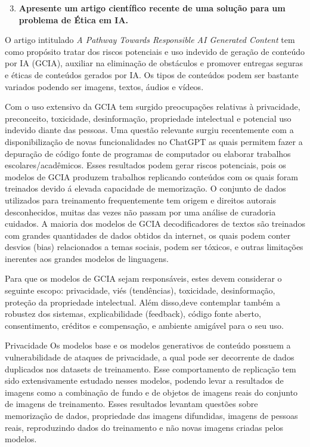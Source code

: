\begin{enumerate}\setcounter{enumi}{2}\bfseries
    \item  \textbf{Apresente um artigo científico recente de uma solução para um problema de Ética em IA.}
\end{enumerate}

O artigo intitulado \textit{A Pathway Towards Responsible AI Generated Content} \cite{chen_fu_lyu} tem como propósito tratar dos riscos potenciais e uso indevido de geração de conteúdo 
por IA (GCIA), 
auxiliar na eliminação de obstáculos e promover entregas seguras e éticas de conteúdos gerados por IA. 
Os tipos de conteúdos podem ser bastante variados podendo ser imagens, textos, áudios e vídeos. 


Com o uso extensivo da GCIA tem surgido preocupações relativas à privacidade, preconceito, toxicidade, desinformação, 
propriedade intelectual e potencial uso indevido diante das pessoas. Uma questão relevante surgiu recentemente com a 
disponibilização de novas funcionalidades no ChatGPT as quais permitem fazer a depuração de código fonte de programas de 
computador ou elaborar trabalhos escolares/acadêmicos. Esses resultados podem gerar riscos potenciais, pois os modelos 
de GCIA produzem trabalhos replicando conteúdos com os quais foram treinados devido á elevada capacidade de memorização.
O conjunto de dados utilizados para 
treinamento frequentemente tem origem e direitos autorais desconhecidos, muitas das vezes não passam por uma análise 
de curadoria cuidados. A maioria dos modelos de GCIA decodificadores de textos são treinados com grandes quantidades 
de dados obtidos da internet, os quais podem conter desvios (bias) relacionados a temas sociais, podem ser tóxicos, 
e outras limitações inerentes aos grandes modelos de linguagens.

Para que os modelos de GCIA sejam responsáveis, estes devem considerar o seguinte escopo: 
privacidade, viés (tendências), toxicidade, desinformação, proteção da propriedade intelectual. 
Além disso,deve contemplar também a robustez dos sistemas, explicabilidade (feedback),
código fonte aberto, consentimento, créditos e compensação, e ambiente amigável para o seu uso.


Privacidade
Os modelos base e os modelos generativos de conteúdo possuem a vulnerabilidade de ataques de privacidade, a qual pode  
ser decorrente de dados duplicados nos datasets de treinamento. Esse comportamento de replicação tem sido 
extensivamente estudado nesses modelos, podendo levar a resultados de imagens como a combinação de fundo e de objetos  
de imagens reais do conjunto de imagens de treinamento. Esses resultados levantam questões sobre 
memorização de dados, propriedade das imagens difundidas, imagens de 
pessoas reais, reproduzindo dados do treinamento e não novas imagens criadas pelos modelos.

